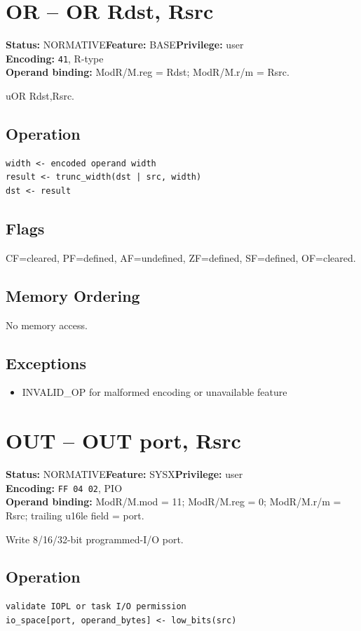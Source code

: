 \documentclass[10pt]{article}
\begin{document}
\section{OR -- OR Rdst, Rsrc}
\textbf{Status:} NORMATIVE\quad \textbf{Feature:} BASE\quad \textbf{Privilege:} user\\
\textbf{Encoding:} \texttt{41}, R-type\\
\textbf{Operand binding:} ModR/M.reg = Rdst; ModR/M.r/m = Rsrc.

uOR Rdst,Rsrc.

\subsection*{Operation}
\begin{lstlisting}
width <- encoded operand width
result <- trunc_width(dst | src, width)
dst <- result
\end{lstlisting}
\subsection*{Flags}
CF=cleared, PF=defined, AF=undefined, ZF=defined, SF=defined, OF=cleared.
\subsection*{Memory Ordering}
No memory access.
\subsection*{Exceptions}
\begin{itemize}
\item INVALID\_OP for malformed encoding or unavailable feature
\end{itemize}
\clearpage

\section{OUT -- OUT port, Rsrc}
\textbf{Status:} NORMATIVE\quad \textbf{Feature:} SYSX\quad \textbf{Privilege:} user\\
\textbf{Encoding:} \texttt{FF 04 02}, PIO\\
\textbf{Operand binding:} ModR/M.mod = 11; ModR/M.reg = 0; ModR/M.r/m = Rsrc; trailing u16le field = port.

Write 8/16/32-bit programmed-I/O port.

\subsection*{Operation}
\begin{lstlisting}
validate IOPL or task I/O permission
io_space[port, operand_bytes] <- low_bits(src)
\end{lstlisting}
\end{document}
